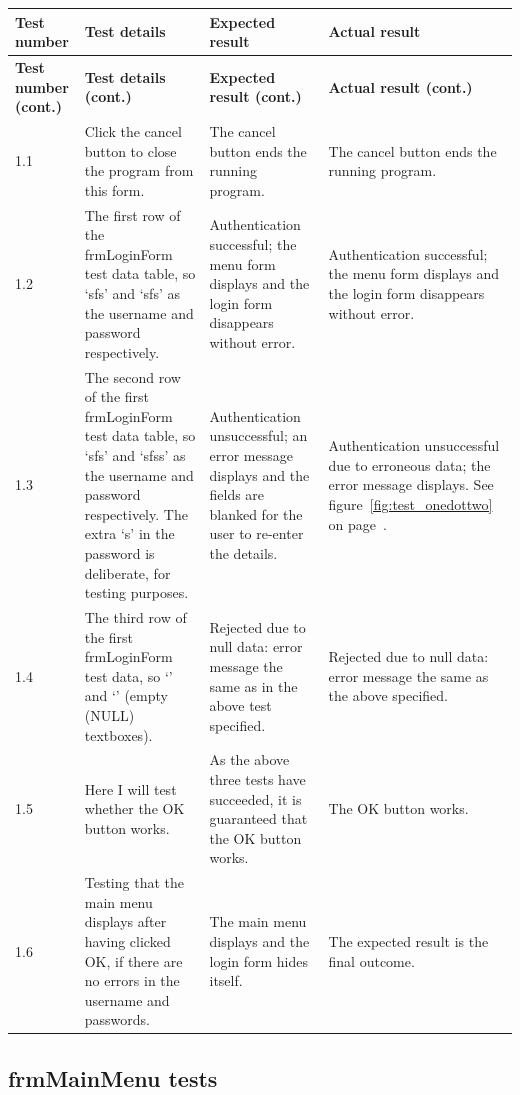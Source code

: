 \begin{longtable}{ | p{2cm} | p{4cm} | p{4cm} | p{4cm} | }
	\hline
	\textbf{Test number} & \textbf{Test details} & \textbf{Expected result} & \textbf{Actual result}\\
	\endfirsthead
	\hline
	\textbf{Test number (cont.)} & \textbf{Test details (cont.)} & \textbf{Expected result (cont.)} & \textbf{Actual result (cont.)}\\
	\endhead
	\hline
	1.1 & Click the cancel button to close the program from this form. & The cancel button ends the running program. & The cancel button ends the running program.\\
	\hline
	1.2 & The first row of the frmLoginForm test data table, so `sfs' and `sfs' as the username and password respectively. & Authentication successful; the menu form displays and the login form disappears without error. & Authentication successful; the menu form displays and the login form disappears without error.\\
	\hline
	1.3 & The second row of the first frmLoginForm test data table, so `sfs' and `sfss' as the username and password respectively.  The extra `s' in the password is deliberate, for testing purposes. & Authentication unsuccessful; an error message displays and the fields are blanked for the user to re-enter the details. & Authentication unsuccessful due to erroneous data; the error message displays.  See figure~\ref{fig:test_onedottwo} on page~\pageref{fig:test_onedottwo}.\\
	\hline
	1.4 & The third row of the first frmLoginForm test data, so `' and `' (empty (NULL) textboxes). & Rejected due to null data: error message the same as in the above test specified. & Rejected due to null data: error message the same as the above specified.\\
	\hline
	1.5 & Here I will test whether the OK button works. & As the above three tests have succeeded, it is guaranteed that the OK button works. & The OK button works.\\
	\hline
	1.6 & Testing that the main menu displays after having clicked OK, if there are no errors in the username and passwords. & The main menu displays and the login form hides itself. & The expected result is the final outcome.\\
	\hline
\end{longtable}

\subsection{frmMainMenu tests}

